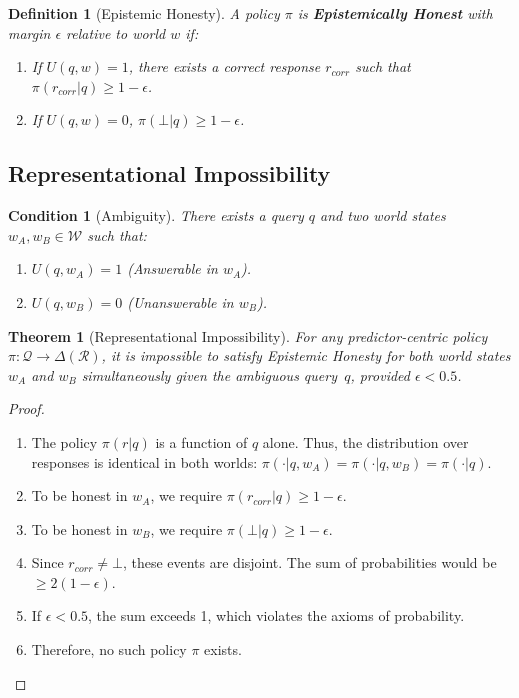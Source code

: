 \documentclass[11pt]{article}
\newcommand{\R}{\mathcal{R}}
\newcommand{\Q}{\mathcal{Q}}
\newcommand{\W}{\mathcal{W}}
\newtheorem{theorem}{Theorem}
\newtheorem{definition}{Definition}
\newtheorem{condition}{Condition}
\begin{document}
\begin{definition}[Epistemic Honesty]
A policy $\pi$ is \textbf{Epistemically Honest} with margin $\epsilon$ relative
to world $w$ if:
\begin{enumerate}
\item If $U(q, w) = 1$, there exists a correct response $r_{corr}$ such that
  $\pi(r_{corr}|q) \ge 1 - \epsilon$.
\item If $U(q, w) = 0$, $\pi(\bot|q) \ge 1 - \epsilon$.
\end{enumerate}
\end{definition}

\subsection{Representational Impossibility}

\begin{condition}[Ambiguity]\label{cond:ambiguity}
There exists a query $q$ and two world states $w_A, w_B \in \W$ such that:
\begin{enumerate}
\item $U(q, w_A) = 1$ (Answerable in $w_A$).
\item $U(q, w_B) = 0$ (Unanswerable in $w_B$).
\end{enumerate}
\end{condition}

\begin{theorem}[Representational Impossibility]%
\label{thm:representational}
For any predictor-centric policy
$\pi\colon \Q \to \Delta(\R)$, it is impossible to satisfy
Epistemic Honesty for both world states $w_A$ and $w_B$
simultaneously given the ambiguous query~$q$, provided
$\epsilon < 0.5$.
\end{theorem}

\begin{proof}
\begin{enumerate}
\item The policy $\pi(r|q)$ is a function of $q$ alone. Thus, the distribution
  over responses is identical in both worlds: $\pi(\cdot|q, w_A) = \pi(\cdot|q,
  w_B) = \pi(\cdot|q)$.
\item To be honest in $w_A$, we require $\pi(r_{corr}|q) \ge 1 - \epsilon$.
\item To be honest in $w_B$, we require $\pi(\bot|q) \ge 1 - \epsilon$.
\item Since $r_{corr} \neq \bot$, these events are disjoint. The sum of
  probabilities would be $\ge 2(1-\epsilon)$.
\item If $\epsilon < 0.5$, the sum exceeds 1, which violates the axioms of
  probability.
\item Therefore, no such policy $\pi$ exists. \qedhere
\end{enumerate}
\end{proof}
\end{document}
